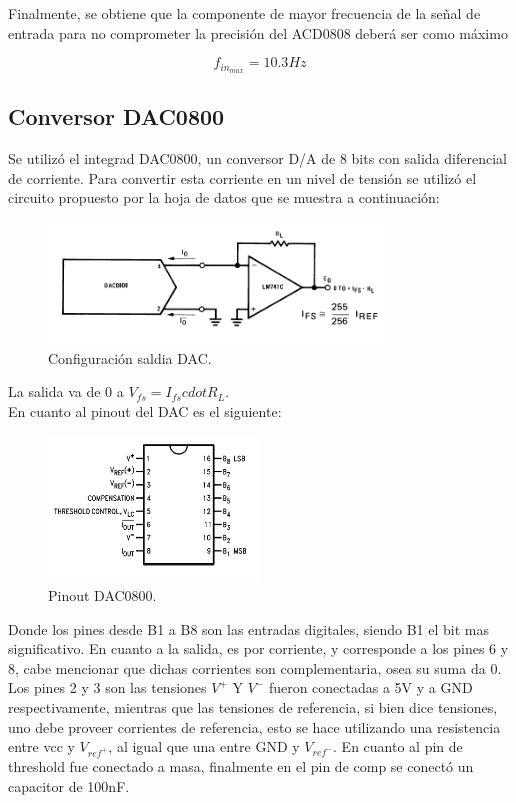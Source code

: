 Finalmente, se obtiene que la componente de mayor frecuencia de la señal de entrada para no comprometer la precisión del ACD0808 deberá ser como máximo

$$f_{in_{max}} = 10.3Hz$$

\subsection{Conversor DAC0800}
Se utilizó el integrad DAC0800, un conversor D/A de 8 bits con salida diferencial de corriente.
Para convertir esta corriente en un nivel de tensión se utilizó el circuito propuesto por la hoja de datos que se muestra a continuación:
\begin{figure}[H]
	\centering
	\includegraphics[width=0.8\textwidth]{ImagenesEjercicio1/dacout.png}
\caption{Configuración saldia DAC.}
	\label{fig:dacout}
\end{figure}
La salida va de 0 a $V_{fs}= I_{fs}cdot R_L$.\\
En cuanto al pinout del DAC es el siguiente:
\begin{figure}[H]
	\centering
	\includegraphics[width=0.5\textwidth]{ImagenesEjercicio1/dacpinout.png}
\caption{Pinout DAC0800.}
	\label{fig:dapinout}
\end{figure}
Donde los pines desde B1 a B8 son las entradas digitales, siendo B1 el bit mas significativo. En cuanto a la salida, es por corriente, y corresponde a los pines 6 y 8, cabe mencionar que dichas corrientes son complementaria, osea su suma da 0. Los pines 2 y 3 son las tensiones $V^+$ Y $V^-$ fueron conectadas a 5V y a GND respectivamente, mientras que las tensiones de referencia, si bien dice tensiones, uno debe proveer corrientes de referencia, esto se hace utilizando una resistencia entre vcc y $V_{ref^+}$, al igual que una entre GND y $V_{ref^-}$. En cuanto al pin de threshold fue conectado a masa, finalmente en el pin de comp se conectó un capacitor de 100nF.

